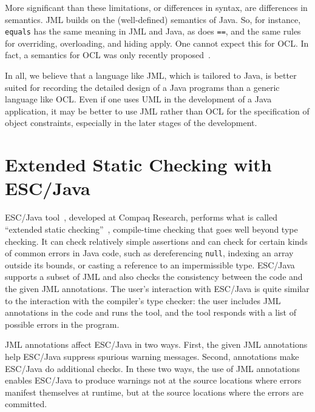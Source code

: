 More significant than these limitations, or differences in syntax, are
differences in semantics.  JML builds on the (well-defined) semantics
of Java. So, for instance, {\tt equals} has the same meaning in JML
and Java, as does {\tt ==}, and the same rules for overriding,
overloading, and hiding apply.  One cannot expect this for OCL\@.  In
fact, a semantics for OCL was only recently
proposed~\cite{brucker.ea:proposal:2002}.

In all, we believe that a language like JML, which is tailored to
Java, is better suited for recording the detailed design of a Java
programs than a generic language like OCL\@.  Even if one uses UML in
the development of a Java application, it may be better to use JML
rather than OCL for the specification of object constraints,
especially in the later stages of the development.




\section{Extended Static Checking with ESC/Java}
\label{escjava}

ESC/Java tool~\cite{Flanagan-Et-Al02}, developed at Compaq Research,
performs what is called ``extended static
checking''~\cite{ESC:Overview,10yearsESC},
compile-time checking that goes well beyond type checking.  It can
check relatively simple assertions and can check for certain kinds of
common errors in Java code, such as dereferencing \texttt{null},
indexing an array outside its bounds, or casting a reference to an
impermissible type.  ESC/Java supports a subset of JML and also checks
the consistency between the code and the given JML annotations.  The
user's interaction with ESC/Java is quite similar to the interaction
with the compiler's type checker: the user includes JML annotations in
the code and runs the tool, and the tool responds with a list of
possible errors in the program.

JML annotations affect ESC/Java in two ways.  First, the given JML
annotations help ESC/Java suppress spurious warning messages.   Second,
annotations make ESC/\-Java do additional checks.  
In these two ways, the use of JML annotations enables ESC/Java to
produce warnings not at the source locations where errors manifest
themselves at runtime, but at the source locations where the errors
are committed.

